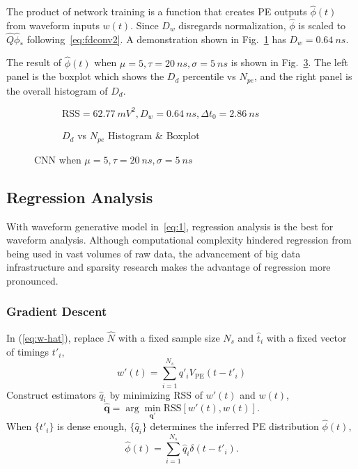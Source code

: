 The product of network training is a function that creates PE outputs $\hat{\phi}(t)$ from waveform inputs $w(t)$.  Since $D_w$ disregards normalization, $\hat{\phi}$ is scaled to $\hat{Q}\hat{\phi}_*$ following~\eqref{eq:fdconv2}. A demonstration shown in Fig.~\ref{fig:cnn} has $D_w = \SI{0.64}{ns}$. 

The result of $\hat{\phi}(t)$ when $\mu=5, \tau=\SI{20}{ns}, \sigma=\SI{5}{ns}$ is shown in Fig.~\ref{fig:cnn-npe}. The left panel is the boxplot which shows the $D_d$ percentile vs $N_{pe}$, and the right panel is the overall histogram of $D_d$. 

\begin{figure}[H]
  \begin{subfigure}{.5\textwidth}
    \centering
    \resizebox{\textwidth}{!}{}
    \caption{\label{fig:cnn}$\mathrm{RSS}=\SI{62.77}{mV^2},D_w=\SI{0.64}{ns},\Delta t_0=\SI{2.86}{ns}$}
  \end{subfigure}
  \begin{subfigure}{.5\textwidth}
    \centering
    \resizebox{\textwidth}{!}{}
    \caption{\label{fig:cnn-npe} $D_d$ vs $N_{pe}$ Histogram \& Boxplot}
  \end{subfigure}
  \caption{CNN when $\mu=5, \tau=\SI{20}{ns}, \sigma=\SI{5}{ns}$}
\end{figure}

\subsection{Regression Analysis}
With waveform generative model in~\eqref{eq:1}, regression analysis is the best for waveform analysis.  Although computational complexity hindered regression from being used in vast volumes of raw data, the advancement of big data infrastructure and sparsity research makes the advantage of regression more pronounced.

\subsubsection{Gradient Descent}
In (\ref{eq:w-hat}), replace $\hat{N}$ with a fixed sample size $N_s$ and $\hat{t}_i$ with a fixed vector of timings $t'_i$,
\begin{equation}
  \label{eq:gd}
  w'(t) = \sum_{i=1}^{N_s}q'_iV_\mathrm{PE}(t-t'_i)
\end{equation}
Construct estimators $\hat{q}_i$ by minimizing RSS of $w'(t)$ and $w(t)$,
\begin{equation}
  \label{eq:gd-q}
  \bm{\hat{q}} = \arg \underset{\bm{q'}}{\min} \mathrm{RSS}\left[w'(t),w(t)\right].
\end{equation}
When $\{t'_i\}$ is dense enough, $\{\hat{q}_i\}$ determines the inferred PE distribution $\hat{\phi}(t)$,
\begin{equation}
  \label{eq:gd-phi}
  \hat{\phi}(t) = \sum_{i=1}^{N_s}\hat{q}_i\delta(t-t'_i).
\end{equation}

